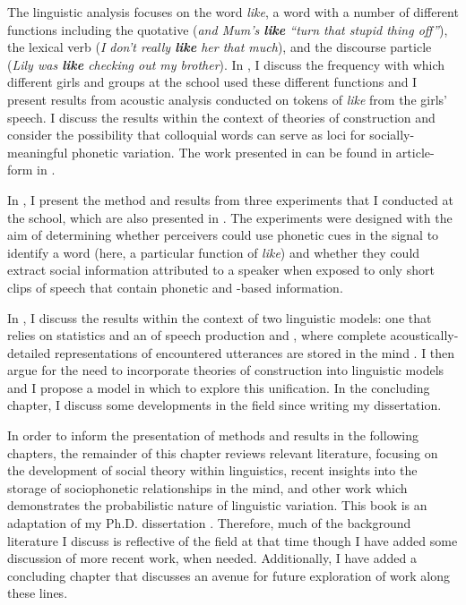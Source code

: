 The linguistic analysis focuses on the word \textit{like}, a word with a number of different functions including the quotative (\textit{and Mum's \textbf{like} ``turn that stupid thing off''}), the lexical verb (\textit{I don't really \textbf{like} her that much}), and the discourse particle (\textit{Lily was \textbf{like} checking out my brother}). In , I discuss the frequency with which different girls and groups at the school used these different functions and I present results from acoustic analysis conducted on tokens of \textit{like} from the girls' speech. I discuss the results within the context of theories of  construction and consider the possibility that colloquial words can serve as loci for socially-meaningful phonetic variation. The work presented in  can be found in article-form in \citet{drager2011-JPhon}.


In , I present the method and results from three  experiments that I conducted at the school, which are also presented in \citet{drager2010-LabPhon}. The experiments were designed with the aim of determining whether perceivers could use phonetic cues in the signal to identify a word (here, a particular function of \textit{like}) and whether they could extract social information attributed to a speaker when exposed to only short clips of speech that contain phonetic and -based information. 

In , I discuss the results within the context of two linguistic models: one that relies on  statistics \citep{jurafsky1996,narayananjurafsky2002} and an  of speech production and , where complete acoustically-detailed representations of encountered utterances are stored in the mind \citep{johnson1997,pisoni1997,pierrehumbert2001}. I then argue for the need to incorporate theories of  construction into linguistic models and I propose a model in which to explore this unification. In the concluding chapter, I discuss some developments in the field since writing my dissertation.

In order to inform the presentation of methods and results in the following chapters, the remainder of this chapter reviews relevant literature, focusing on the development of social theory within linguistics, recent insights into the storage of sociophonetic relationships in the mind, and other work which demonstrates the probabilistic nature of linguistic variation. This book is an adaptation of my Ph.D. dissertation \citep{drager2009-thesis}. Therefore, much of the background literature I discuss is reflective of the field at that time though I have added some discussion of more recent work, when needed. Additionally, I have added a concluding chapter that discusses an avenue for future exploration of work along these lines.

